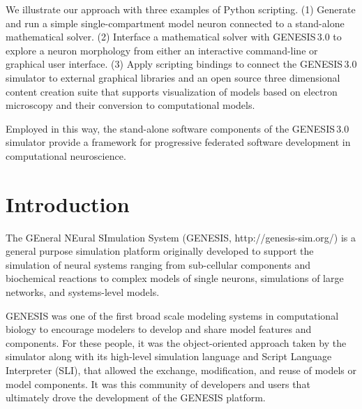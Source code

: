 \documentclass[10pt]{article}
\begin{document}
We illustrate our approach with three examples of Python scripting. 
(1) Generate and run a simple single-compartment model neuron connected to a 
stand-alone mathematical solver. (2) Interface a mathematical solver with GENESIS\,3.0 to explore a neuron morphology from either
an interactive command-line or graphical user interface.
(3) Apply scripting bindings to connect the GENESIS\,3.0 simulator to
external graphical libraries and an open source three dimensional content creation
suite that supports visualization of models based on electron
microscopy and their conversion to computational
models.

Employed in this way, the stand-alone software components of the GENESIS\,3.0 
simulator provide a framework for progressive federated
software development in computational neuroscience.\\


\section*{Introduction}

The GEneral NEural SImulation System (GENESIS,
http://genesis-sim.org/) is a general purpose simulation platform originally
developed to support the simulation of neural systems ranging from
sub-cellular components and biochemical reactions to complex models of
single neurons, simulations of large networks, and systems-level
models.

GENESIS was one of the first broad scale modeling systems in
computational biology to encourage modelers to develop and share model
features and components. For these people, it was the object-oriented
approach taken by the simulator along with its high-level simulation
language and Script Language Interpreter (SLI), that allowed the exchange, modification, and reuse of models
or model components.  It was this community of developers and
 users that ultimately drove the development of the GENESIS platform.
 
\end{document}
